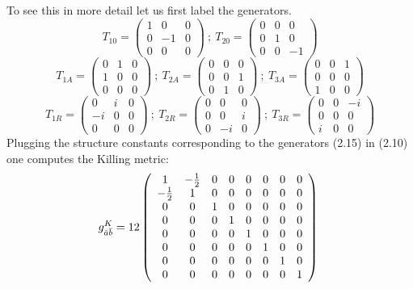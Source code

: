 \documentclass[a4paper,12pt]{article}
\begin{document}
To see this in more detail let us first label the generators.
$$
T_{10}=\left( \begin{array}{ccc}
1& 0&0\\
0& -1&0\\
0& 0& 0
\end{array} \right)\ ;\ 
T_{20}=\left( \begin{array}{ccc}
0& 0&0\\
0& 1&0\\
0& 0& -1
\end{array} \right)
$$
$$
T_{1A}=\left( \begin{array}{ccc}
0& 1&0\\
1& 0&0\\
0& 0& 0
\end{array} \right)\ ;\ 
T_{2A}=\left( \begin{array}{ccc}
0& 0&0\\
0& 0&1\\
0& 1& 0
\end{array} \right)\ ;\ 
T_{3A}=\left( \begin{array}{ccc}
0& 0&1\\
0& 0&0\\
1& 0& 0
\end{array} \right)
$$
\begin{equation}
T_{1R}=\left( \begin{array}{ccc}
0& i&0\\
-i& 0&0\\
0& 0& 0
\end{array} \right)\ ;\ 
T_{2R}=\left( \begin{array}{ccc}
0& 0&0\\
0& 0&i\\
0& -i& 0
\end{array} \right)\ ;\ 
T_{3R}=\left( \begin{array}{ccc}
0& 0&-i\\
0& 0&0\\
i& 0& 0
\end{array} \right)
\end{equation}
Plugging the structure constants corresponding to the generators (2.15) in (2.10) one computes the Killing metric:
\begin{equation}
g^K_{\breve{a}\breve{b}}=12\left( \begin{array}{cccccccc}
1& -\textstyle{1\over 2}&0&0&0&0&0&0\\
-\textstyle{1\over 2}& 1&0&0&0&0&0&0\\
0& 0  &1&0&0&0&0&0\\
0& 0  &0&1&0&0&0&0\\
0& 0  &0&0&1&0&0&0\\
0& 0  &0&0&0&1&0&0\\
0& 0  &0&0&0&0&1&0\\
0& 0  &0&0&0&0&0&1
\end{array} \right)\ 
\end{equation}
\end{document}
